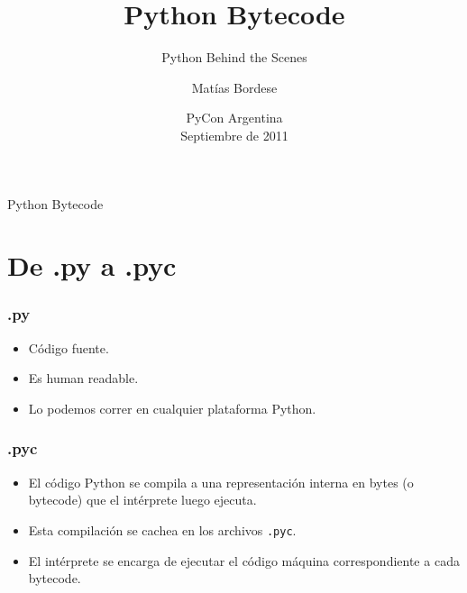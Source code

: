 \documentclass[9pt, notes=hide]{beamer}
\title{Python Bytecode}
\subtitle{Python Behind the Scenes}
\author{Matías Bordese}
\institute{}
\date{PyCon Argentina\\Septiembre de 2011}
\begin{document}

\begin{frame}
    \titlepage
\end{frame}

\section*{}
    \begin{frame}{Python Bytecode}
        \tableofcontents
    \end{frame}


\section{De .py a .pyc}

    \begin{frame}
        \frametitle{.py}

        \begin{itemize}
            \item Código fuente.
            \item Es human readable.
            \item Lo podemos correr en cualquier plataforma Python.
        \end{itemize}
    \end{frame}

    \begin{frame}
        \frametitle{.pyc}

        \begin{itemize}
            \item El código Python se compila a una representación interna en bytes (o bytecode) que el intérprete luego ejecuta.
            \item Esta compilación se cachea en los archivos \texttt{.pyc}.
            \item El intérprete se encarga de ejecutar el código máquina correspondiente a cada bytecode.
        \end{itemize}
    \end{frame}
\end{document}

